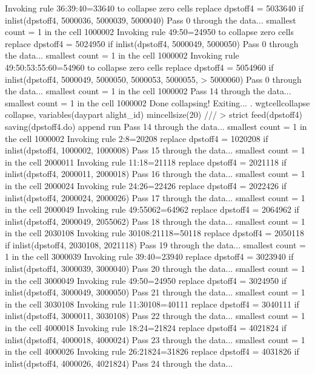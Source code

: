   Invoking rule 36:39:40=33640 to collapse zero cells
  replace dpstoff4 = 5033640 if inlist(dpstoff4, 5000036, 5000039, 5000040)
Pass 0 through the data...
  smallest count = 1 in the cell      1000002
  Invoking rule 49:50=24950 to collapse zero cells
  replace dpstoff4 = 5024950 if inlist(dpstoff4, 5000049, 5000050)
Pass 0 through the data...
  smallest count = 1 in the cell      1000002
  Invoking rule 49:50:53:55:60=54960 to collapse zero cells
  replace dpstoff4 = 5054960 if inlist(dpstoff4, 5000049, 5000050, 5000053, 5000055,
>  5000060)
Pass 0 through the data...
  smallest count = 1 in the cell      1000002
Pass 14 through the data...
  smallest count = 1 in the cell      1000002
  Done collapsing! Exiting...
{\smallskip}
. wgtcellcollapse collapse, variables(daypart alight_id) mincellsize(20) ///
>         strict feed(dpstoff4) saving(dpstoff4.do) append run
Pass 14 through the data...
  smallest count = 1 in the cell      1000002
  Invoking rule 2:8=20208
  replace dpstoff4 = 1020208 if inlist(dpstoff4, 1000002, 1000008)
Pass 15 through the data...
  smallest count = 1 in the cell      2000011
  Invoking rule 11:18=21118
  replace dpstoff4 = 2021118 if inlist(dpstoff4, 2000011, 2000018)
Pass 16 through the data...
  smallest count = 1 in the cell      2000024
  Invoking rule 24:26=22426
  replace dpstoff4 = 2022426 if inlist(dpstoff4, 2000024, 2000026)
Pass 17 through the data...
  smallest count = 1 in the cell      2000049
  Invoking rule 49:55062=64962
  replace dpstoff4 = 2064962 if inlist(dpstoff4, 2000049, 2055062)
Pass 18 through the data...
  smallest count = 1 in the cell      2030108
  Invoking rule 30108:21118=50118
  replace dpstoff4 = 2050118 if inlist(dpstoff4, 2030108, 2021118)
Pass 19 through the data...
  smallest count = 1 in the cell      3000039
  Invoking rule 39:40=23940
  replace dpstoff4 = 3023940 if inlist(dpstoff4, 3000039, 3000040)
Pass 20 through the data...
  smallest count = 1 in the cell      3000049
  Invoking rule 49:50=24950
  replace dpstoff4 = 3024950 if inlist(dpstoff4, 3000049, 3000050)
Pass 21 through the data...
  smallest count = 1 in the cell      3030108
  Invoking rule 11:30108=40111
  replace dpstoff4 = 3040111 if inlist(dpstoff4, 3000011, 3030108)
Pass 22 through the data...
  smallest count = 1 in the cell      4000018
  Invoking rule 18:24=21824
  replace dpstoff4 = 4021824 if inlist(dpstoff4, 4000018, 4000024)
Pass 23 through the data...
  smallest count = 1 in the cell      4000026
  Invoking rule 26:21824=31826
  replace dpstoff4 = 4031826 if inlist(dpstoff4, 4000026, 4021824)
Pass 24 through the data...
